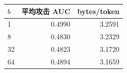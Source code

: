 \begin{tabular}{lrr}
\toprule
$b$ & 平均攻击 AUC & bytes/token \\
\midrule
1 & 0.4990 & 3.2591 \\
8 & 0.4830 & 3.2329 \\
32 & 0.4823 & 3.1720 \\
64 & 0.4894 & 3.1659 \\
\bottomrule
\end{tabular}
